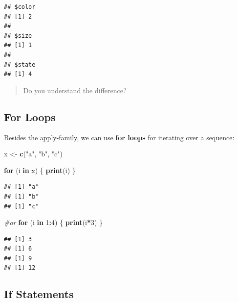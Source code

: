 \documentclass[
]{book}
\newenvironment{Shaded}{\begin{snugshade}}{\end{snugshade}}
\newcommand{\CommentTok}[1]{\textcolor[rgb]{0.56,0.35,0.01}{\textit{#1}}}
\newcommand{\ControlFlowTok}[1]{\textcolor[rgb]{0.13,0.29,0.53}{\textbf{#1}}}
\newcommand{\DecValTok}[1]{\textcolor[rgb]{0.00,0.00,0.81}{#1}}
\newcommand{\FunctionTok}[1]{\textcolor[rgb]{0.13,0.29,0.53}{\textbf{#1}}}
\newcommand{\NormalTok}[1]{#1}
\newcommand{\OtherTok}[1]{\textcolor[rgb]{0.56,0.35,0.01}{#1}}
\newcommand{\SpecialCharTok}[1]{\textcolor[rgb]{0.81,0.36,0.00}{\textbf{#1}}}
\newcommand{\StringTok}[1]{\textcolor[rgb]{0.31,0.60,0.02}{#1}}
\begin{document}
\begin{verbatim}
## $color
## [1] 2
## 
## $size
## [1] 1
## 
## $state
## [1] 4
\end{verbatim}

\begin{quote}
Do you understand the difference?
\end{quote}

\hypertarget{for-loops}{%
\subsection*{For Loops}\label{for-loops}}

Besides the apply-family, we can use \textbf{for loops} for iterating over a sequence:

\begin{Shaded}
\begin{Highlighting}[]
\NormalTok{x }\OtherTok{\textless{}{-}} \FunctionTok{c}\NormalTok{(}\StringTok{"a"}\NormalTok{, }\StringTok{"b"}\NormalTok{, }\StringTok{"c"}\NormalTok{)}

\ControlFlowTok{for}\NormalTok{ (i }\ControlFlowTok{in}\NormalTok{ x) \{}
  \FunctionTok{print}\NormalTok{(i)}
\NormalTok{\}}
\end{Highlighting}
\end{Shaded}

\begin{verbatim}
## [1] "a"
## [1] "b"
## [1] "c"
\end{verbatim}

\begin{Shaded}
\begin{Highlighting}[]
\CommentTok{\#or }
\ControlFlowTok{for}\NormalTok{ (i }\ControlFlowTok{in} \DecValTok{1}\SpecialCharTok{:}\DecValTok{4}\NormalTok{) \{}
  \FunctionTok{print}\NormalTok{(i}\SpecialCharTok{*}\DecValTok{3}\NormalTok{)}
\NormalTok{\}}
\end{Highlighting}
\end{Shaded}

\begin{verbatim}
## [1] 3
## [1] 6
## [1] 9
## [1] 12
\end{verbatim}

\hypertarget{if-statements}{%
\subsection*{If Statements}\label{if-statements}}
\end{document}
